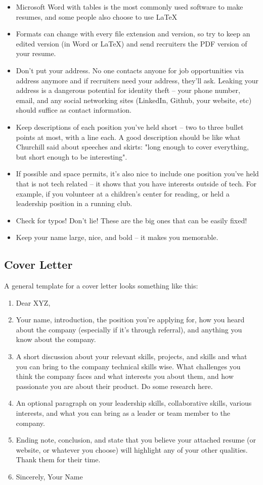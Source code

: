 \documentclass{article}
\begin{document}
\begin{itemize}
    \item Microsoft Word with tables is the most commonly used software to make resumes, and some people also choose to use LaTeX
    \item Formats can change with every file extension and version, so try to keep an edited version (in Word or LaTeX) and send recruiters the PDF version of your resume. 
    \item Don't put your address. No one contacts anyone for job opportunities via address anymore and if recruiters need your address, they'll ask. Leaking your address is a dangerous potential for identity theft -- your phone number, email, and any social networking sites (LinkedIn, Github, your website, etc) should suffice as contact information.
    \item Keep descriptions of each position you've held short -- two to three bullet points at most, with a line each. A good description should be like what Churchill said about speeches and skirts: "long enough to cover everything, but short enough to be interesting". 
    \item If possible and space permits, it's also nice to include one position you've held that is not tech related -- it shows that you have interests outside of tech. For example, if you volunteer at a children's center for reading, or held a leadership position in a running club.  
    \item Check for typos! Don't lie! These are the big ones that can be easily fixed!
    \item Keep your name large, nice, and bold -- it makes you memorable.
\end{itemize} 
\subsection{Cover Letter}
\hspace{0.5cm} A general template for a cover letter looks something like this:
\begin{enumerate}
    \item Dear XYZ,
    \item Your name, introduction, the position you're applying for, how you heard about the company (especially if it's through referral), and anything you know about the company.
    \item A short discussion about your relevant skills, projects, and skills and what you can bring to the company technical skills wise. What challenges you think the company faces and what interests you about them, and how passionate you are about their product. Do some research here.
    \item An optional paragraph on your leadership skills, collaborative skills, various interests, and what you can bring as a leader or team member to the company.
    \item Ending note, conclusion, and state that you believe your attached resume (or website, or whatever you choose) will highlight any of your other qualities. Thank them for their time.
    \item Sincerely, Your Name
\end{enumerate}
\end{document}
